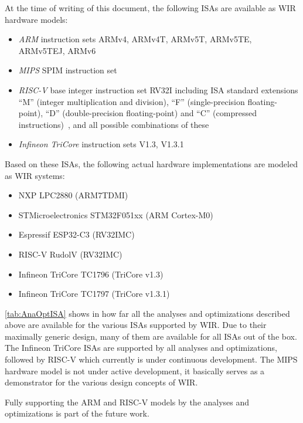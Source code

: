 At the time of writing of this document, the following \glspl{ISA} are available as \gls{WIR} hardware models:
\begin{itemize}
  \item \textit{ARM} instruction sets ARMv4, ARMv4T, ARMv5T, ARMv5TE, ARMv5TEJ, ARMv6~\cite{arm05}
  \item \textit{MIPS} SPIM instruction set~\cite{mips07}
  \item \textit{RISC-V} base integer instruction set RV32I including \gls{ISA} standard extensions ``M'' (integer multiplication and division), ``F'' (single-precision floating-point), ``D'' (double-precision floating-point) and ``C'' (compressed instructions)~\cite{riscv17}, and all possible combinations of these
  \item \textit{Infineon TriCore} instruction sets V1.3, V1.3.1~\cite{tricore08}
\end{itemize}
Based on these \glspl{ISA}, the following actual hardware implementations are modeled as \gls{WIR} systems:
\begin{itemize}
  \item NXP LPC2880 (ARM7TDMI)
  \item STMicroelectronics STM32F051xx (ARM Cortex-M0)
  \item Espressif ESP32-C3 (RV32IMC)
  \item RISC-V RudolV (RV32IMC)
  \item Infineon TriCore TC1796 (TriCore v1.3)
  \item Infineon TriCore TC1797 (TriCore v1.3.1)
\end{itemize}

\cref{tab:AnaOptISA} shows in how far all the analyses and optimizations described above are available for the various \glspl{ISA} supported by \gls{WIR}.
Due to their maximally generic design, many of them are available for all \glspl{ISA} out of the box.
The Infineon TriCore \glspl{ISA} are supported by all analyses and optimizations, followed by RISC-V which currently is under continuous development.
The MIPS hardware model is not under active development, it basically serves as a demonstrator for the various design concepts of \gls{WIR}.
\begin{wirFutureWork}
Fully supporting the ARM and RISC-V models by the analyses and optimizations is part of the future work.
\end{wirFutureWork}

